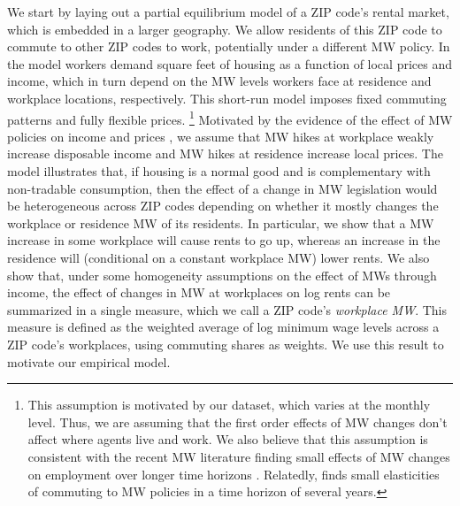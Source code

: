 We start by laying out a partial equilibrium model of a ZIP code's rental market,
which is embedded in a larger geography.
We allow residents of this ZIP code to commute to other ZIP codes to work, 
potentially under a different MW policy.
In the model workers demand square feet of housing as a function of local prices 
and income, which in turn depend on the MW levels workers face at residence and 
workplace locations, respectively.
This short-run model imposes fixed commuting patterns and fully flexible 
prices.%
\footnote{This assumption is motivated by our dataset, which varies at the 
monthly level. Thus, we are assuming that the first order effects of 
MW changes don't affect where agents live and work.
We also believe that this assumption is consistent with the recent MW literature
finding small effects of MW changes on employment over longer time horizons
\parencite[see][for a review]{Dube2019}.
Relatedly, \textcite{PerezPerez2021} finds small elasticities of commuting to MW 
policies in a time horizon of several years.}
Motivated by the evidence of the effect of MW policies on 
income \parencite{Dube2019Income, CegnizEtAl2019} and 
prices \parencite{AllegrettoReich2018, Leung2021},
we assume that MW hikes at workplace weakly increase disposable income and MW 
hikes at residence increase local prices.
The model illustrates that, if housing is a normal good and is complementary 
with non-tradable consumption, then the effect of a change in MW legislation 
would be heterogeneous across ZIP codes depending on whether it mostly changes 
the workplace or residence MW of its residents.
In particular, we show that a MW increase in some workplace will cause rents to 
go up, whereas an increase in the residence will (conditional on a constant 
workplace MW) lower rents.
We also show that, under some homogeneity assumptions on the effect of MWs 
through income, the effect of changes in MW at workplaces on log rents can be 
summarized in a single measure, which we call a ZIP code's \textit{workplace MW}.
This measure is defined as the weighted average of log minimum wage levels 
across a ZIP code's workplaces, using commuting shares as weights.
We use this result to motivate our empirical model.


